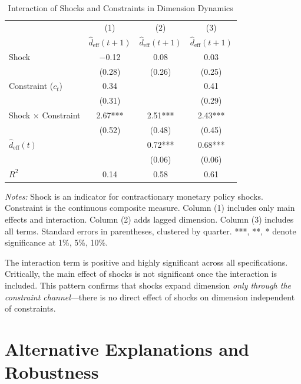 \documentclass[12pt,letterpaper]{article}
\theoremstyle{plain}
\theoremstyle{definition}
\begin{document}
\begin{table}[htbp]
\centering
\caption{Interaction of Shocks and Constraints in Dimension Dynamics}
\label{tab:interaction}
\begin{tabular}{lccc}
\toprule
& (1) & (2) & (3) \\
& $\hat{d}_{\text{eff}}(t+1)$ & $\hat{d}_{\text{eff}}(t+1)$ & $\hat{d}_{\text{eff}}(t+1)$ \\
\midrule
Shock & $-$0.12 & 0.08 & 0.03 \\
& (0.28) & (0.26) & (0.25) \\[0.3em]
Constraint ($c_t$) & 0.34 & & 0.41 \\
& (0.31) & & (0.29) \\[0.3em]
Shock $\times$ Constraint & 2.67*** & 2.51*** & 2.43*** \\
& (0.52) & (0.48) & (0.45) \\[0.5em]
$\hat{d}_{\text{eff}}(t)$ & & 0.72*** & 0.68*** \\
& & (0.06) & (0.06) \\[0.5em]
$R^2$ & 0.14 & 0.58 & 0.61 \\
\bottomrule
\end{tabular}

\vspace{0.5em}
\footnotesize
\textit{Notes:} Shock is an indicator for contractionary monetary policy shocks. Constraint is the continuous composite measure. Column (1) includes only main effects and interaction. Column (2) adds lagged dimension. Column (3) includes all terms. Standard errors in parentheses, clustered by quarter. ***, **, * denote significance at 1\%, 5\%, 10\%.
\end{table}

The interaction term is positive and highly significant across all specifications. Critically, the main effect of shocks is not significant once the interaction is included. This pattern confirms that shocks expand dimension \textit{only through the constraint channel}---there is no direct effect of shocks on dimension independent of constraints.


\section{Alternative Explanations and Robustness}\label{sec:alternatives}
\end{document}
